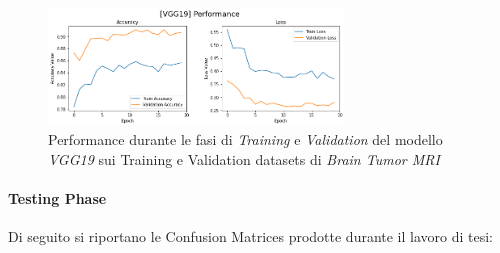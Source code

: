             \begin{figure}[!h]
                \centering
                \includegraphics [width=0.7\textwidth]{Images/Modelli/VGG19/VGG19 Brain Performance.png}
                \caption{Performance durante le fasi di \textit{Training} e \textit{Validation} del modello \textit{VGG19} sui Training e Validation datasets di \textit{Brain Tumor MRI}}
                \label{VGG19 Brain Performance}
            \end{figure}
        
        \paragraph{Testing Phase}
        Di seguito si riportano le Confusion Matrices prodotte durante il lavoro di tesi:
            \begin{figure}[!h]
                \centering
                \quad
                \caption{}
                \label{VGG19 Confusion Matrix}
            \end{figure}
        \newpage 
       
